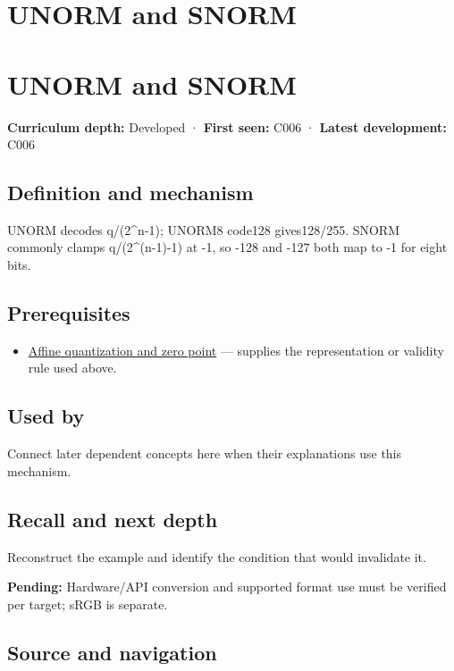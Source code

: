 \hypertarget{appendix-b2402c453dac}{}
\section*{UNORM and SNORM}
\section{UNORM and SNORM}\label{unorm-and-snorm}

\textbf{Curriculum depth:} Developed · \textbf{First seen:} C006 · \textbf{Latest development:} C006

\subsection{Definition and mechanism}\label{definition-and-mechanism}

UNORM decodes q/(2\^{}n-1); UNORM8 code128 gives128/255. SNORM commonly clamps q/(2\^{}(n-1)-1) at -1, so -128 and -127 both map to -1 for eight bits.

\subsection{Prerequisites}\label{prerequisites}

\begin{itemize}
\tightlist
\item
  \hyperref[appendix-d5da3eaabaef]{Affine quantization and zero point} --- supplies the representation or validity rule used above.
\end{itemize}

\subsection{Used by}\label{used-by}

Connect later dependent concepts here when their explanations use this mechanism.

\subsection{Recall and next depth}\label{recall-and-next-depth}

Reconstruct the example and identify the condition that would invalidate it.

\textbf{Pending:} Hardware/API conversion and supported format use must be verified per target; sRGB is separate.

\subsection{Source and navigation}\label{source-and-navigation}

